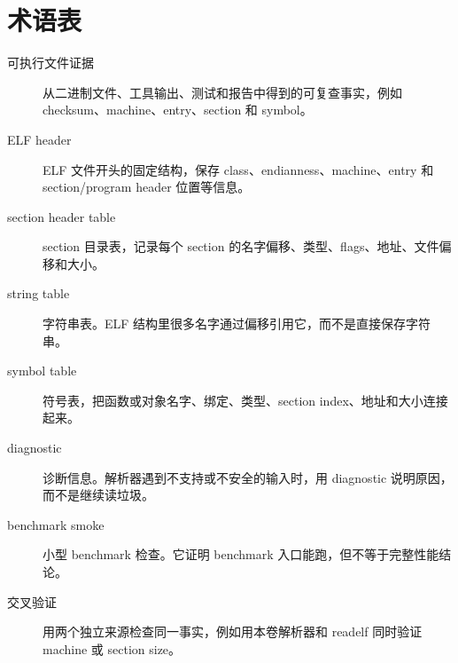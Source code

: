 \chapter*{术语表}
{}

\begin{description}
  \item[可执行文件证据] 从二进制文件、工具输出、测试和报告中得到的可复查事实，例如 checksum、machine、entry、section 和 symbol。
  \item[ELF header] ELF 文件开头的固定结构，保存 class、endianness、machine、entry 和 section/program header 位置等信息。
  \item[section header table] section 目录表，记录每个 section 的名字偏移、类型、flags、地址、文件偏移和大小。
  \item[string table] 字符串表。ELF 结构里很多名字通过偏移引用它，而不是直接保存字符串。
  \item[symbol table] 符号表，把函数或对象名字、绑定、类型、section index、地址和大小连接起来。
  \item[diagnostic] 诊断信息。解析器遇到不支持或不安全的输入时，用 diagnostic 说明原因，而不是继续读垃圾。
  \item[benchmark smoke] 小型 benchmark 检查。它证明 benchmark 入口能跑，但不等于完整性能结论。
  \item[交叉验证] 用两个独立来源检查同一事实，例如用本卷解析器和 readelf 同时验证 machine 或 section size。
\end{description}
